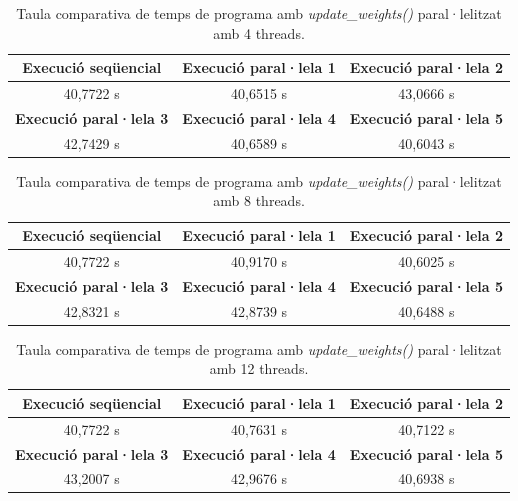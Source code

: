 \documentclass{article}
\begin{document}
\begin{table}[H]
    \centering
    \begin{tabular}{|c|c|c|}
        \hline
        \textbf{Execució seqüencial} & \textbf{Execució paral·lela 1} & \textbf{Execució paral·lela 2} \\ \hline
        40,7722 s & 40,6515 s & 43,0666 s \\ \hline
        \textbf{Execució paral·lela 3} & \textbf{Execució paral·lela 4} & \textbf{Execució paral·lela 5} \\ \hline
        42,7429 s & 40,6589 s & 40,6043 s \\ \hline
    \end{tabular}
    \caption{Taula comparativa de temps de programa amb \textit{update\_weights()} paral·lelitzat amb 4 threads.}
    \label{tab:f6_4trheads}
\end{table}

\begin{table}[H]
    \centering
    \begin{tabular}{|c|c|c|}
        \hline
        \textbf{Execució seqüencial} & \textbf{Execució paral·lela 1} & \textbf{Execució paral·lela 2} \\ \hline
        40,7722 s & 40,9170 s & 40,6025 s \\ \hline
        \textbf{Execució paral·lela 3} & \textbf{Execució paral·lela 4} & \textbf{Execució paral·lela 5} \\ \hline
        42,8321 s & 42,8739 s & 40,6488 s \\ \hline
    \end{tabular}
    \caption{Taula comparativa de temps de programa amb \textit{update\_weights()} paral·lelitzat amb 8 threads.}
    \label{tab:f6_8trheads}
\end{table}

\begin{table}[H]
    \centering
    \begin{tabular}{|c|c|c|}
        \hline
        \textbf{Execució seqüencial} & \textbf{Execució paral·lela 1} & \textbf{Execució paral·lela 2} \\ \hline
        40,7722 s & 40,7631 s & 40,7122 s \\ \hline
        \textbf{Execució paral·lela 3} & \textbf{Execució paral·lela 4} & \textbf{Execució paral·lela 5} \\ \hline
        43,2007 s & 42,9676 s & 40,6938 s \\ \hline
    \end{tabular}
    \caption{Taula comparativa de temps de programa amb \textit{update\_weights()} paral·lelitzat amb 12 threads.}
    \label{tab:f6_12trheads}
\end{table}
\end{document}
